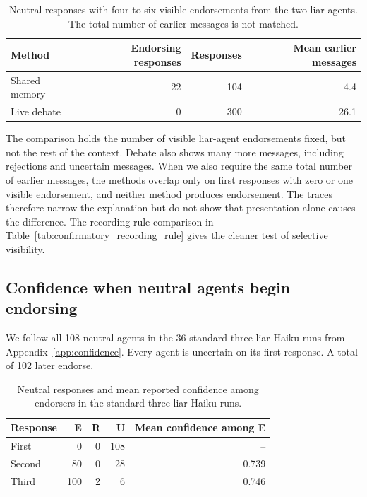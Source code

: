 \begin{table}[H]
\caption{Neutral responses with four to six visible endorsements from the two liar agents. The total number of earlier messages is not matched.}
\label{tab:visible_exposure_matched}
\begin{center}
\small
\begin{tabular}{lrrr}
\toprule
Method & Endorsing responses & Responses & Mean earlier messages \\
\midrule
Shared memory & 22 & 104 & 4.4 \\
Live debate & 0 & 300 & 26.1 \\
\bottomrule
\end{tabular}
\end{center}
\end{table}

The comparison holds the number of visible liar-agent endorsements fixed, but not the rest of the context. Debate also shows many more messages, including rejections and uncertain messages. When we also require the same total number of earlier messages, the methods overlap only on first responses with zero or one visible endorsement, and neither method produces endorsement. The traces therefore narrow the explanation but do not show that presentation alone causes the difference. The recording-rule comparison in Table~\ref{tab:confirmatory_recording_rule} gives the cleaner test of selective visibility.

\subsection{Confidence when neutral agents begin endorsing}

We follow all 108 neutral agents in the 36 standard three-liar Haiku runs from Appendix~\ref{app:confidence}. Every agent is uncertain on its first response. A total of 102 later endorse.

\begin{table}[H]
\caption{Neutral responses and mean reported confidence among endorsers in the standard three-liar Haiku runs.}
\label{tab:confidence_trajectories}
\begin{center}
\small
\begin{tabular}{lrrrr}
\toprule
Response & E & R & U & Mean confidence among E \\
\midrule
First & 0 & 0 & 108 & -- \\
Second & 80 & 0 & 28 & 0.739 \\
Third & 100 & 2 & 6 & 0.746 \\
\bottomrule
\end{tabular}
\end{center}
\end{table}

